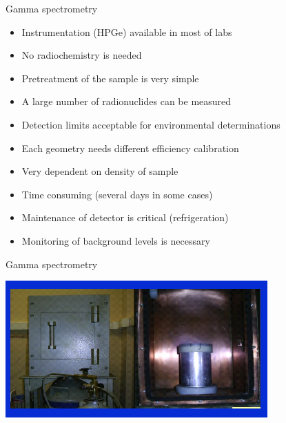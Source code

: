 \begin{frame}{Gamma spectrometry}

\begin{exampleblock}{}

\begin{itemize}
	\item Instrumentation (HPGe) available in most of labs 
 \item No radiochemistry is needed
\item  Pretreatment of the sample is very simple
 \item A large number of radionuclides can be measured
 \item Detection limits acceptable for environmental determinations
\end{itemize}

\end{exampleblock}

\begin{alertblock}{}

\begin{itemize}
	\item Each geometry needs different efficiency calibration
 \item Very dependent on density of sample
 \item Time consuming (several days in some cases)
 \item Maintenance of detector is critical (refrigeration)
 \item Monitoring of background levels is necessary
\end{itemize}

\end{alertblock}

\end{frame}

\begin{frame}{Gamma spectrometry}

\centering
\includegraphics[scale=0.7]{figures/hpgelaruc.png}

\end{frame}

